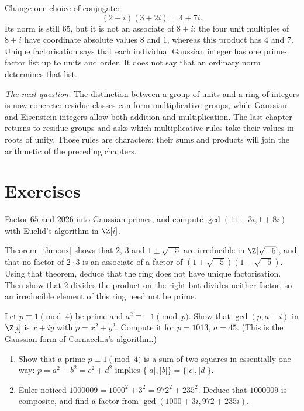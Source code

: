 Change one choice of conjugate:
\[
(2+i)(3+2i)=4+7i.
\]
Its norm is still $65$, but it is not an associate of $8+i$: the four unit multiples of $8+i$ have coordinate absolute values $8$ and $1$, whereas this product has $4$ and $7$. Unique factorisation says that each individual Gaussian integer has one prime-factor list up to units and order. It does not say that an ordinary norm determines that list.

\medskip
\noindent\emph{The next question.} The distinction between a group of units and a ring of integers is now concrete: residue classes can form multiplicative groups, while Gaussian and Eisenstein integers allow both addition and multiplication. The last chapter returns to residue groups and asks which multiplicative rules take their values in roots of unity. Those rules are characters; their sums and products will join the arithmetic of the preceding chapters.

\section{Exercises}

\begin{exercise}[$\star$]\label{ex:gaussfactor}
Factor $65$ and $2026$ into Gaussian primes, and compute $\gcd(11+3i,1+8i)$ with Euclid's algorithm in $\Z[i]$.
\end{exercise}

\begin{exercise}[$\star$]\label{ex:zsqrt5}
Theorem~\ref{thm:six} shows that $2$, $3$ and $1\pm\sqrt{-5}$ are irreducible in $\Z[\sqrt{-5}]$, and that no factor of $2\cdot3$ is an associate of a factor of $(1+\sqrt{-5})(1-\sqrt{-5})$. Using that theorem, deduce that the ring does not have unique factorisation. Then show that $2$ divides the product on the right but divides neither factor, so an irreducible element of this ring need not be prime.
\end{exercise}

\begin{exercise}[$\star\star$]\label{ex:gaussgcd}
Let $p\equiv1\pmod4$ be prime and $a^2\equiv-1\pmod p$. Show that $\gcd(p,a+i)$ in $\Z[i]$ is $x+iy$ with $p=x^2+y^2$. Compute it for $p=1013$, $a=45$. (This is the Gaussian form of Cornacchia's algorithm.)
\end{exercise}

\begin{exercise}[$\star\star$]\label{ex:euler1000009}
\begin{enumerate}[label=(\alph*)]
\item Show that a prime $p\equiv1\pmod4$ is a sum of two squares in essentially one way: $p=a^2+b^2=c^2+d^2$ implies $\{|a|,|b|\}=\{|c|,|d|\}$.
\item Euler noticed $1000009=1000^2+3^2=972^2+235^2$. Deduce that $1000009$ is composite, and find a factor from $\gcd(1000+3i,972+235i)$.
\end{enumerate}
\end{exercise}

